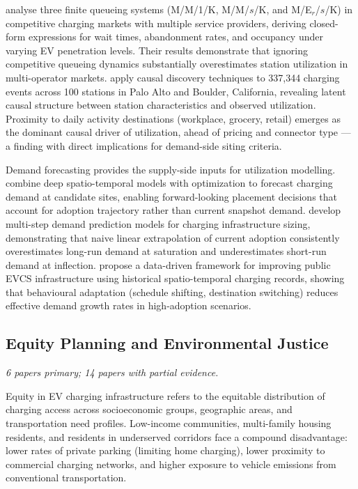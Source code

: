 \documentclass[12pt,letterpaper]{article}
\begin{document}
\citet{nguyen2025} analyse three finite queueing systems
(M/M/1/K, M/M/$s$/K, and M/E$_r$/$s$/K) in competitive charging markets
with multiple service providers, deriving closed-form expressions for
wait times, abandonment rates, and occupancy under varying EV penetration
levels.  Their results demonstrate that ignoring competitive queueing
dynamics substantially overestimates station utilization in multi-operator
markets.  \citet{junker2025} apply causal discovery techniques to
337,344 charging events across 100 stations in Palo Alto and Boulder,
California, revealing latent causal structure between station
characteristics and observed utilization.  Proximity to daily activity
destinations (workplace, grocery, retail) emerges as the dominant causal
driver of utilization, ahead of pricing and connector type --- a finding
with direct implications for demand-side siting criteria.

Demand forecasting provides the supply-side inputs for utilization
modelling.  \citet{huttel2021} combine deep spatio-temporal models with
optimization to forecast charging demand at candidate sites, enabling
forward-looking placement decisions that account for adoption trajectory
rather than current snapshot demand.  \citet{gopalakrishnan2016} develop
multi-step demand prediction models for charging infrastructure sizing,
demonstrating that naive linear extrapolation of current adoption
consistently overestimates long-run demand at saturation and
underestimates short-run demand at inflection.  \citet{al_dahabreh2023}
propose a data-driven framework for improving public EVCS infrastructure
using historical spatio-temporal charging records, showing that
behavioural adaptation (schedule shifting, destination switching) reduces
effective demand growth rates in high-adoption scenarios.

\subsection{Equity Planning and Environmental Justice}

\textit{6 papers primary; 14 papers with partial evidence.}

Equity in EV charging infrastructure refers to the equitable distribution
of charging access across socioeconomic groups, geographic areas, and
transportation need profiles.  Low-income communities, multi-family
housing residents, and residents in underserved corridors face a compound
disadvantage: lower rates of private parking (limiting home charging),
lower proximity to commercial charging networks, and higher exposure to
vehicle emissions from conventional transportation.
\end{document}
